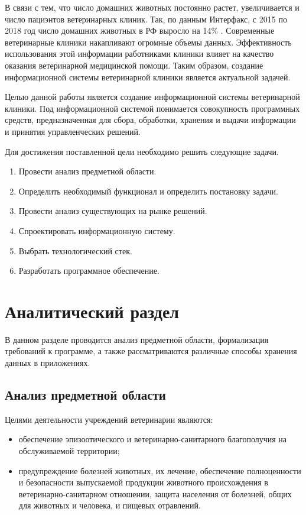 \documentclass[a4paper,14pt]{article}
\begin{document}
В связи с тем, что число домашних животных постоянно растет, увеличивается и число пациэнтов ветеринарных клиник. Так, по данным Интерфакс, с 2015 по 2018 год число домашних животных в РФ выросло на 14\% \cite{interfax_14}.  Современные ветеринарные клиники накапливают огромные объемы данных. Эффективность использования этой информации работниками клиники влияет на качество оказания ветеринарной медицинской помощи.
Таким образом, создание информационной системы ветеринарной клиники является актуальной задачей.

Целью данной работы является создание информационной системы ветеринарной клиники. Под информационной системой понимается совокупность программных средств, предназначенная для сбора, обработки, хранения и выдачи информации и принятия управленческих решений.

Для достижения поставленной цели необходимо решить следующие задачи.

\begin{enumerate}
	\item Провести анализ предметной области.
	\item Определить необходимый функционал и определить постановку задачи.
	\item Провести анализ существующих на рынке решений.
	\item Спроектировать информационную систему.
	\item Выбрать технологический стек.
	\item Разработать программное обеспечение.
\end{enumerate}

\newpage
\section{Аналитический раздел}

В данном разделе проводится анализ предметной области, формализация требований к программе, а также рассматриваются различные способы хранения данных в приложениях.

\subsection{Анализ предметной области}

Целями деятельности учреждений ветеринарии являются:

\begin{itemize}
	\item обеспечение эпизоотического и ветеринарно-санитарного благополучия на обслуживаемой территории;
	\item предупреждение болезней животных, их лечение, обеспечение полноценности и безопасности выпускаемой продукции животного происхождения в ветеринарно-санитарном отношении, защита населения от болезней, общих для животных и человека, и пищевых отравлений. 
\end{itemize}
\end{document}
